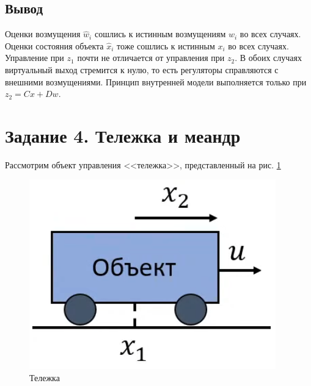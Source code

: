 \documentclass[a4paper, 12pt]{article}
\begin{document}
    \subsection{Вывод}
    Оценки возмущения $\hat{w}_i$ сошлись к истинным возмущениям $w_i$ во всех случаях.
    Оценки состояния объекта $\hat{x}_i$ тоже сошлись к истинным $x_i$ во всех случаях.
    Управление при $z_1$ почти не отличается от управления при $z_2$. В обоих случаях
    виртуальный выход стремится к нулю, то есть регуляторы справляются с внешними
    возмущениями. Принцип внутренней модели выполняется только при $z_2=Cx+Dw$.


    \section{Задание 4. Тележка и меандр}
    Рассмотрим объект управления <<тележка>>, представленный на рис. \ref{fig:4task_scheme}
    \begin{figure}[H]
        \centering
        \includegraphics[scale=0.55]{4task_scheme.png}
        \captionsetup{skip=0pt}
        \caption{Тележка}
        \label{fig:4task_scheme}
    \end{figure}
\end{document}
